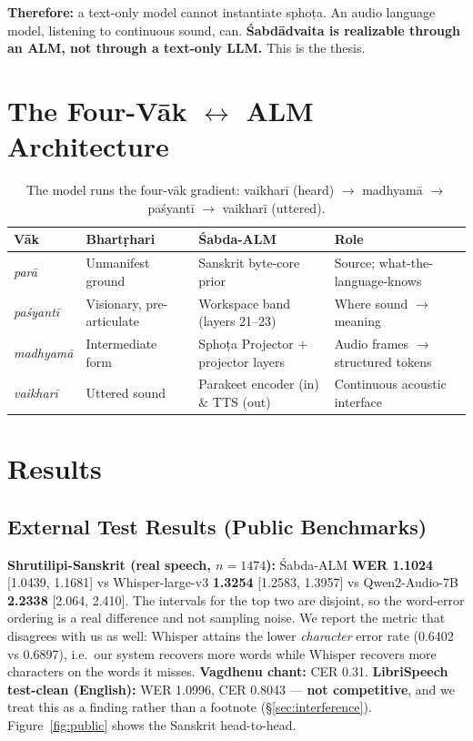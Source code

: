\documentclass[11pt]{article}
\begin{document}
\textbf{Therefore:} a text-only model cannot instantiate sphoṭa. An audio language model, listening to continuous sound, can. \textbf{Śabdādvaita is realizable through an ALM, not through a text-only LLM.} This is the thesis.

\section{The Four-Vāk $\leftrightarrow$ ALM Architecture}

\begin{table}[h]\centering\small
\begin{tabular}{llll}
\toprule
Vāk & Bhartṛhari & Śabda-ALM & Role \\
\midrule
\emph{parā} & Unmanifest ground & Sanskrit byte-core prior & Source; what-the-language-knows \\
\emph{paśyantī} & Visionary, pre-articulate & Workspace band (layers 21--23) & Where sound $\to$ meaning \\
\emph{madhyamā} & Intermediate form & Sphoṭa Projector $+$ projector layers & Audio frames $\to$ structured tokens \\
\emph{vaikharī} & Uttered sound & Parakeet encoder (in) $\&$ TTS (out) & Continuous acoustic interface \\
\bottomrule
\end{tabular}
\caption{The model runs the four-vāk gradient: vaikharī (heard) $\to$ madhyamā $\to$ paśyantī $\to$ vaikharī (uttered).}
\end{table}

\section{Results}

\subsection{External Test Results (Public Benchmarks)}

\textbf{Shrutilipi-Sanskrit (real speech, $n{=}1474$):} Śabda-ALM \textbf{WER 1.1024} [1.0439, 1.1681] vs Whisper-large-v3 \textbf{1.3254} [1.2583, 1.3957] vs Qwen2-Audio-7B \textbf{2.2338} [2.064, 2.410]. The intervals for the top two are disjoint, so the word-error ordering is a real difference and not sampling noise. We report the metric that disagrees with us as well: Whisper attains the lower \emph{character} error rate (0.6402 vs 0.6897), i.e.\ our system recovers more words while Whisper recovers more characters on the words it misses. \textbf{Vagdhenu chant:} CER 0.31. \textbf{LibriSpeech test-clean (English):} WER 1.0996, CER 0.8043 --- \textbf{not competitive}, and we treat this as a finding rather than a footnote (\S\ref{sec:interference}). Figure~\ref{fig:public} shows the Sanskrit head-to-head.
\end{document}

